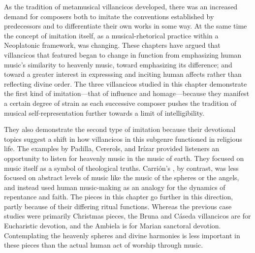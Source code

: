 As the tradition of metamusical villancicos developed, there was an increased demand for composers both to imitate the conventions established by predecessors and to differentiate their own works in some way. 
At the same time the concept of imitation itself, as a musical-rhetorical practice within a Neoplatonic framework, was changing.
These chapters have argued that villancicos that featured  began to change in function from emphasizing human music's similarity to heavenly music, toward emphasizing its difference; and toward a greater interest in expresssing and inciting human affects rather than reflecting divine order.
The three villancicos studied in this chapter demonstrate the first kind of imitation---that of influence and homage---because they manifest a certain degree of strain as each successive composer pushes the tradition of musical self-representation further towards a limit of intelligibility.

They also demonstrate the second type of imitation because their devotional topics suggest a shift in how villancicos in this subgenre functioned in religious life.
The examples by Padilla, Cererols, and Irízar provided listeners an opportunity to listen for heavenly music in the music of earth. 
They focused on music itself as a symbol of theological truths.
Carrión's , by contrast, was less focused on abstract levels of music like the music of the spheres or the angels, and instead used human music-making as an analogy for the dynamics of repentance and faith.
The pieces in this chapter go further in this direction, partly because of their differing ritual functions.
Whereas the previous case studies were primarily Christmas pieces, the Bruna and Cáseda villancicos are for Eucharistic devotion, and the Ambiela is for Marian sanctoral devotion.
Contemplating the heavenly spheres and divine harmonies is less important in these pieces than the actual human act of worship through music.

